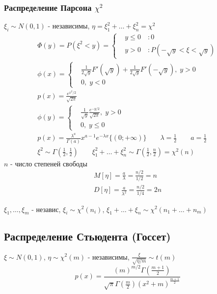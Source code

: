 \documentclass{article}
\begin{document}
\subsubsection[Распределение Парсона]{Распределение Парсона $\chi^2$}
$\xi_i\sim N(0,1)$ - независимы, $\eta=\xi_1^2+\dots+\xi_n^2=\chi^2$
\begin{gather*}
  \Phi(y)=P(\xi^2<y)=\left\{\begin{aligned}
    & y\le0 \quad :0 \\
    & y > 0 \quad :P(-\sqrt{y}<\xi<\sqrt{y})
  \end{aligned}\right. \\
  \phi(x)=   \left\{\begin{aligned}
      & \frac{1}{2\sqrt{y}}F'(\sqrt{y})+\frac{1}{2\sqrt{y}}F'(-\sqrt{y}), \; y> 0 \\
      & 0, \; y<0
    \end{aligned}\right. \\
  p(x)=\frac{e^{x^2/2}}{\sqrt{2\pi}} \\
  \phi(y)=\left\{\begin{aligned}
    & \frac{1}{\sqrt{y}}\frac{e^{-y/2}}{\sqrt{2\pi}}, \; y>0  \\
    & 0, \; y\le 0
  \end{aligned}\right. \\
  p(x)=\frac{\lambda^{a}}{\Gamma(a)}x^{a-1}e^{-\lambda x}\{(0;+\infty)\} \qquad \lambda=\frac{1}{2} \qquad a=\frac{1}{2} \\
  \xi^{2}\sim \Gamma(\frac{1}{2}, \frac{1}{2}) \qquad \xi_1^{2}+\dots+\xi_n^{2} \sim \Gamma(\frac{1}{2}, \frac{n}{2})=\chi^{2}(n)
\end{gather*}
$n$ - число степеней свободы
\begin{gather*}
  M[\eta]=\frac{a}{\lambda}=\frac{n/2}{1/2}=n \\
  D[\eta]=\frac{a}{\lambda^{2}}=\frac{n/2}{1/4}=2n
\end{gather*}

\begin{theorem}
  $\xi_1,\dots,\xi_m$ - независ, $\xi_i\sim \chi^{2}(n_i)$, $\xi_1+\dots+\xi_n\sim \chi^2(n_1+\dots+n_m)$
\end{theorem}

\subsection{Распределение Стьюдента (Госсет)}
$\xi \sim N(0,1)$, $\eta \sim \chi^2(m)$ - независимы, $\frac{\xi}{\sqrt{\eta/m}}\sim t(m)$ \\
\[
  p(x)=\frac{(m)^{m/2}\Gamma(\frac{m+1}{2})}{\sqrt{\pi}\Gamma(\frac{m}{2})(x^2+m)^{\frac{m+1}{2}}}
\]
\end{document}
